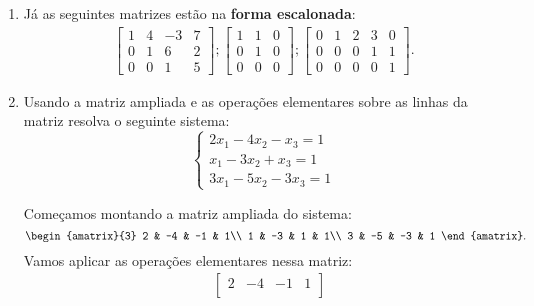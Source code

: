 \begin{exemplos}
\begin{enumerate}[label={\arabic*})]
        \item J\'a as seguintes matrizes est\~ao na \textbf{forma escalonada}:
            \begin{align*}
                \begin{bmatrix}
                    1 & 4 & -3 & 7\\
                    0 & 1 & 6 & 2\\
                    0 & 0 & 1 & 5
                \end{bmatrix};
                \begin{bmatrix}
                    1 & 1 & 0\\
                    0 & 1 & 0\\
                    0 & 0 & 0
                \end{bmatrix};
                \begin{bmatrix}
                    0 & 1 & 2 & 3 & 0\\
                    0 & 0 & 0 & 1 & 1\\
                    0 & 0 & 0 & 0 & 1
                \end{bmatrix}.
            \end{align*}
        \item Usando a matriz ampliada e as opera\c{c}\~oes elementares sobre as linhas da matriz resolva o seguinte sistema:
            \[
                \begin{cases}
                    2x_1 - 4x_2 - x_3 = 1\\
                    x_1 - 3x_2 + x_3 = 1\\
                    3x_1 - 5x_2 - 3x_3 = 1
                \end{cases}
            \]
            \begin{solucao}
                Come\c{c}amos montando a matriz ampliada do sistema:
                \[
                    \begin{amatrix}{3}
                    2 & -4 & -1 & 1\\
                1 & -3 & 1 & 1\\
                3 & -5 & -3 & 1
                    \end{amatrix}.
                \]
                Vamos aplicar as opera\c{c}\~oes elementares nessa matriz:
                \begin{align*}
                    &\begin{bmatrix}
                        2 & -4 & -1 & 1\\

\end{bmatrix}
\end{align*}
\end{solucao}
\end{enumerate}
\end{exemplos}
